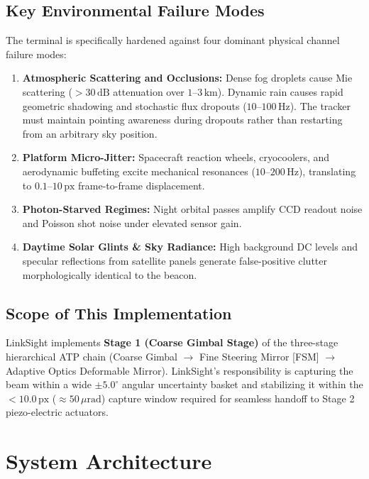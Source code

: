 \documentclass[11pt,a4paper]{article}
\begin{document}
\subsection{Key Environmental Failure Modes}
The terminal is specifically hardened against four dominant physical channel failure modes:
\begin{enumerate}[label=(\alph*),noitemsep,topsep=2pt]
    \item \textbf{Atmospheric Scattering and Occlusions:} Dense fog droplets cause Mie scattering ($>30\,\text{dB}$ attenuation over $1$--$3\,\text{km}$). Dynamic rain causes rapid geometric shadowing and stochastic flux dropouts ($10$--$100\,\text{Hz}$). The tracker must maintain pointing awareness during dropouts rather than restarting from an arbitrary sky position.
    \item \textbf{Platform Micro-Jitter:} Spacecraft reaction wheels, cryocoolers, and aerodynamic buffeting excite mechanical resonances ($10$--$200\,\text{Hz}$), translating to $0.1$--$10\,\text{px}$ frame-to-frame displacement.
    \item \textbf{Photon-Starved Regimes:} Night orbital passes amplify CCD readout noise and Poisson shot noise under elevated sensor gain.
    \item \textbf{Daytime Solar Glints \& Sky Radiance:} High background DC levels and specular reflections from satellite panels generate false-positive clutter morphologically identical to the beacon.
\end{enumerate}

\subsection{Scope of This Implementation}
LinkSight implements \textbf{Stage 1 (Coarse Gimbal Stage)} of the three-stage hierarchical ATP chain (Coarse Gimbal $\rightarrow$ Fine Steering Mirror [FSM] $\rightarrow$ Adaptive Optics Deformable Mirror). LinkSight's responsibility is capturing the beam within a wide $\pm 5.0^\circ$ angular uncertainty basket and stabilizing it within the $< 10.0\,\text{px}$ ($\approx 50\,\mu\text{rad}$) capture window required for seamless handoff to Stage 2 piezo-electric actuators.

\FloatBarrier

\section{System Architecture}
\end{document}
